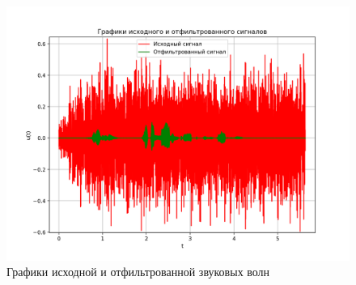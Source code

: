 \begin{figure}[ht!]
    \centering
    \includegraphics[scale=0.6]{media/2 task/Wave_comparison.png}
    \caption{Графики исходной и отфильтрованной звуковых волн}
    \label{fig:filteredс_wave}
\end{figure}